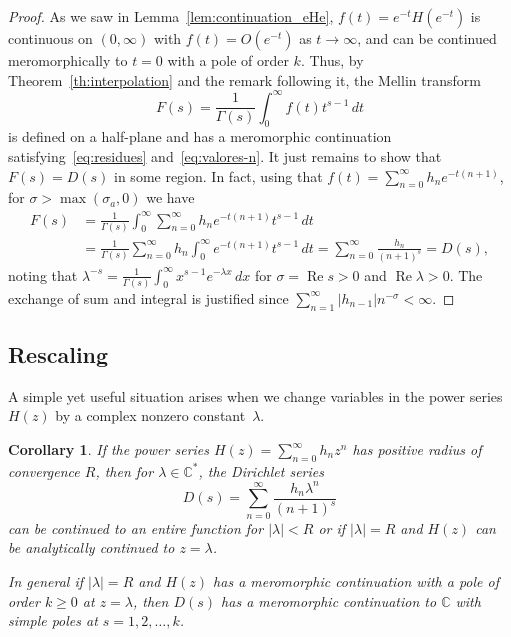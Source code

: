 \documentclass[11pt,a4paper]{amsart}
\newcommand{\N}{\mathbb{N}}
\newcommand{\C}{\mathbb{C}}
\renewcommand{\Re}{\operatorname{Re}}
\theoremstyle{plain}
\theoremstyle{plain}
\newtheorem{corollary}{Corollary}
\theoremstyle{plain}
\theoremstyle{definition}
\theoremstyle{remark}
\begin{document}
\begin{proof}
As we saw in Lemma~\ref{lem:continuation_eHe}, $f(t) = e^{-t} H(e^{-t})$ is continuous on $(0,\infty)$ with $f(t) = O(e^{-t})$ as $t \to \infty$, and can be continued meromorphically to $t = 0$ with a pole of order $k$. Thus, by Theorem~\ref{th:interpolation} and the remark following it, the Mellin transform
\begin{equation*}
  F(s) = \frac{1}{\Gamma(s)} \int_{0}^{\infty} f(t) t^{s-1}\,dt
\end{equation*}
is defined on a half-plane and has a meromorphic continuation satisfying~\eqref{eq:residues} and~\eqref{eq:valores-n}. It just remains to show that $F(s) = D(s)$ in some region. 
In fact, using that $f(t) = \sum_{n=0}^{\infty} h_{n} e^{-t(n+1)}$, for $\sigma > \max(\sigma_{a},0)$ we have 
\begin{align*}
  F(s) &= \frac{1}{\Gamma(s)}\int_{0}^{\infty} \sum_{n=0}^{\infty} h_{n} e^{-t(n+1)} t^{s-1}\,dt
  \\
  &=\frac{1}{\Gamma(s)}\sum_{n=0}^{\infty} h_{n} \int_{0}^{\infty} e^{-t(n+1)} t^{s-1}\,dt
  = \sum_{n=0}^{\infty} \frac{h_{n}}{(n+1)^s}
  = D(s),
\end{align*}
noting that  $\lambda^{-s} = \frac{1}{\Gamma(s)} \int_{0}^{\infty} x^{s-1} e^{-\lambda x}\,dx$  for $\sigma = \Re s > 0$ and $\Re \lambda > 0$. The exchange of sum and integral is justified since $\sum_{n=1}^{\infty} |h_{n-1}| n^{-\sigma} < \infty$.
\end{proof}


\subsection{Rescaling}
\label{subsec:rescaling}

A simple yet useful situation arises when we change variables in the power series $H(z)$ by a complex nonzero constant~$\lambda$.


\begin{corollary}
\label{cor:rescaling}
If the power series $H(z) = \sum_{n=0}^{\infty} h_{n} z^{n}$ has positive radius of convergence $R$, then for $\lambda \in \C^{*}$, the Dirichlet series
\[
  D(s) = \sum_{n=0}^{\infty} \frac{h_{n} \lambda^{n}}{(n+1)^{s}}  
\]
can be continued to an entire function for $|\lambda| < R$ or if $|\lambda| = R$ and $H(z)$ can be analytically continued to $z=\lambda$.

In general if $|\lambda| = R$ and $H(z)$ has a meromorphic continuation with a pole of order $k \geq 0$ at $z = \lambda$, then $D(s)$ has a meromorphic continuation to $\C$ with simple poles at $s = 1,2,\ldots,k$.
\end{corollary}
\end{document}
